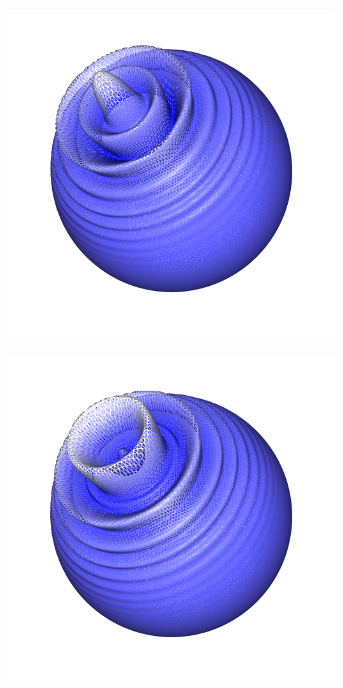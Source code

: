 \documentclass[crop=false]{standalone}
\begin{document}
\begin{figure}[h]
\begin{subfigure}[b]{0.24\textwidth}
        \caption{}
      \end{subfigure}
      \begin{subfigure}[b]{0.24\textwidth}
        \center
        \includegraphics[trim={2.12cm 2.33cm 2.2cm 0cm},clip,width=0.95\textwidth]{images/sphere_wave_2.png}
        \caption{}
      \end{subfigure}
      \begin{subfigure}[b]{0.24\textwidth}
        \center
        \includegraphics[trim={2.12cm 2.33cm 2.2cm 0cm},clip,width=0.95\textwidth]{images/sphere_wave_3.png}
        \caption{}
      \end{subfigure}


\end{figure}
\end{document}
